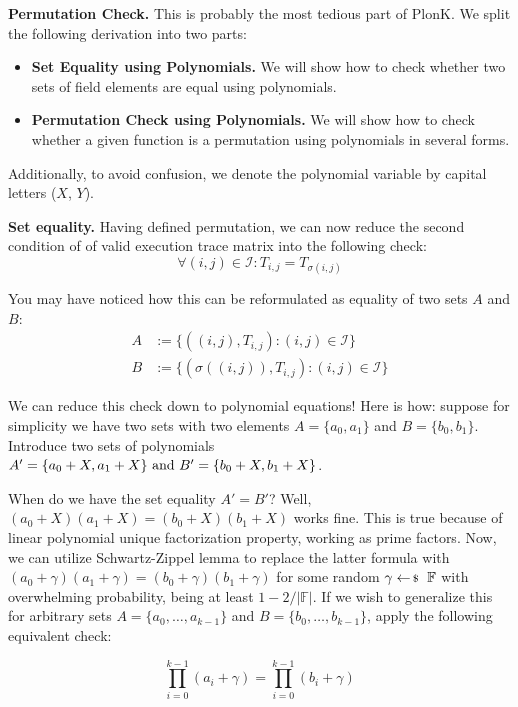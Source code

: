 \documentclass[../lecture-notes-148x210.tex]{subfiles}
\begin{document}
\textcolor{green!60!black}{\textbf{Permutation Check.}} This is probably the most
tedious part of PlonK. We split the following derivation into two parts:
\begin{itemize}
    \item \textbf{Set Equality using Polynomials.} We will show how to check
    whether two sets of field elements are equal using polynomials.
    \item \textbf{Permutation Check using Polynomials.} We will show how to
    check whether a given function is a permutation using polynomials in several 
    forms.
\end{itemize}

Additionally, to avoid confusion, we denote the polynomial variable by capital letters ($X$, $Y$).

\textbf{Set equality.} Having defined permutation, we can now reduce the second
condition of  of valid execution trace matrix into
the following check:
\[\forall (i, j) \in \mathcal{I}: T_{i,j} = T_{\sigma(i,j)}\]

You may have noticed how this can be reformulated as equality of two sets $A$ and $B$:
\begin{align*}
    A &:= \{((i, j), T_{i,j}) : (i, j) \in \mathcal{I}\} \\
    B &:= \{(\sigma((i, j)), T_{i,j}) : (i, j) \in \mathcal{I}\}
\end{align*}

We can reduce this check down to polynomial equations! Here is how: suppose for
simplicity we have two sets with two elements \(A = \{a_0, a_1\}\) and \(B =
\{b_0, b_1\}\). Introduce two sets of polynomials \(A' = \{a_0 + X, a_1 +
X\}$ and $B' = \{b_0 + X, b_1 + X\}\). 

When do we have the set equality \(A' = B'\)? Well, \((a_0 + X)(a_1 + X) = (b_0
+ X)(b_1 + X)\) works fine. This is true because of linear polynomial unique
factorization property, working as prime factors. Now, we can utilize
Schwartz-Zippel lemma to replace the latter formula with \((a_0 + \gamma)(a_1 +
\gamma) = (b_0 + \gamma)(b_1 + \gamma)\) for some random $\gamma \leftarrowS
\mathbb{F}$ with overwhelming probability, being at least $1-2/|\mathbb{F}|$. If we
wish to generalize this for arbitrary sets \(A = \{a_0, \ldots, a_{k-1}\}\) and
\(B = \{b_0, \ldots, b_{k-1}\}\), apply the following equivalent check:

\[\prod_{i=0}^{k-1} (a_i + \gamma) = \prod_{i=0}^{k-1} (b_i + \gamma)\]
\end{document}
